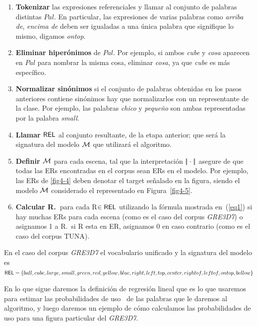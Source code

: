 \begin{enumerate}
\item \textbf{Tokenizar} las expresiones referenciales y llamar al conjunto de palabras distintas
 $Pal$. En particular, las expresiones de varias palabras como {\it arriba de}, {\it encima de}
  deben ser igualadas a una \'unica palabra que signifique lo mismo, digamos \emph{ontop}.

\item \textbf{Eliminar hiper\'onimos} de $Pal$. Por ejemplo, si ambos \emph{cube} y
  \emph{cosa} aparecen en $Pal$ para nombrar la misma cosa, eliminar \emph{cosa}, ya que \emph{cube} es m\'as espec\'ifico.

\item \textbf{Normalizar sin\'onimos} si el conjunto de palabras obtenidas en los pasos anteriores contiene
  sin\'onimos hay que normalizarlos con un representante de la clase. Por ejemplo, las palabras \emph{chico}
  y \emph{peque\~no} son ambas representadas por la palabra \emph{small}.

\item \textbf{Llamar $\textsf{REL}$} al conjunto resultante, de la etapa anterior; que ser\'a la signatura del modelo $\mathcal{M}$ que utilizar\'a el algoritmo.

\item \textbf{Definir $\mathcal{M}$} para cada escena, tal que la interpretaci\'on
 $|\!|\cdot|\!|$ asegure de que todas las ERs encontradas en el corpus sean ERs en
  el modelo. Por ejemplo, las ERs de \ref{fig4-4} deben denotar el target se\~nalado en la figura, siendo el modelo 
$\mathcal{M}$ considerado el representado en Figura~\ref{fig4-5}.
\item \textbf{Calcular R.\puse\ }para cada R$\in \textsf{REL}$ utilizando la f\'ormula mostrada en~(\ref{eq1}) si
  hay muchas ERs para cada escena (como es el caso del corpus \textit{GRE3D7}) o asignamos 1 a R.\puse \ si R esta en ER, asignamos 0 en caso contrario (como es el caso del corpus TUNA).
\end{enumerate}

En el caso del corpus \textit{GRE3D7} el vocabulario unificado y la signatura del modelo es 
$\textsf{REL} = \{ball, cube, large, small, green, red, yellow, blue, right, left, top, center, rightof, leftof, ontop, bellow\} $

En lo que sigue daremos la definici\'on de regresi\'on lineal que es lo que usaremos para estimar las probabilidades de uso \puse\ de las palabras que le daremos al algoritmo, y luego daremos un ejemplo de c\'omo calculamos las probabilidades de uso para una figura particular del \textit{GRE3D7}.

